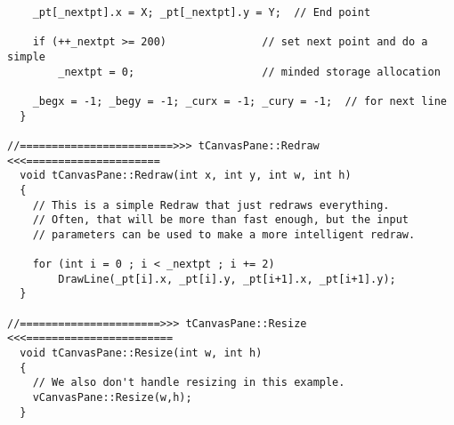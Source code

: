 \begin{verbatim}
    _pt[_nextpt].x = X; _pt[_nextpt].y = Y;  // End point

    if (++_nextpt >= 200)               // set next point and do a simple
        _nextpt = 0;                    // minded storage allocation

    _begx = -1; _begy = -1; _curx = -1; _cury = -1;  // for next line
  }

//========================>>> tCanvasPane::Redraw <<<=====================
  void tCanvasPane::Redraw(int x, int y, int w, int h)
  {
    // This is a simple Redraw that just redraws everything.
    // Often, that will be more than fast enough, but the input
    // parameters can be used to make a more intelligent redraw.

    for (int i = 0 ; i < _nextpt ; i += 2)
        DrawLine(_pt[i].x, _pt[i].y, _pt[i+1].x, _pt[i+1].y);
  }

//======================>>> tCanvasPane::Resize <<<=======================
  void tCanvasPane::Resize(int w, int h)
  {
    // We also don't handle resizing in this example.
    vCanvasPane::Resize(w,h);
  }
\end{verbatim}
\normalfont\normalsize

